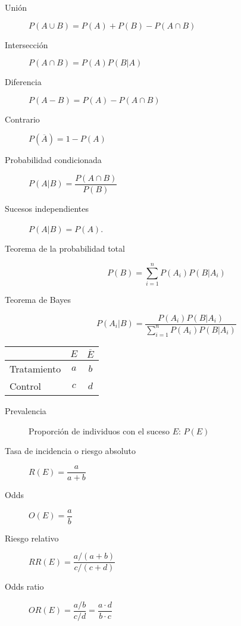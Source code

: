 \begin{multicols*}{2}
\begin{tcolorbox}[hbox, title=Probabilidad básica]
\begin{minipage}{0.4\textwidth}
\begin{description}
\item [Unión] $P(A\cup B)=P(A)+P(B)-P(A\cap B)$
\item [Intersección] $P(A\cap B)=P(A)P(B|A)$
\item [Diferencia] $P(A-B)=P(A)-P(A\cap B)$
\item [Contrario] $P(\overline{A})=1-P(A)$
\end{description}
\end{minipage}
\end{tcolorbox}

\begin{tcolorbox}[hbox, title=Probabilidad condicionada]
\begin{minipage}{0.4\textwidth}
\begin{description}
\item [Probabilidad condicionada] $P(A|B)=\dfrac{P(A\cap B)}{P(B)}$
\item [Sucesos independientes] $P(A|B)=P(A)$.
\item [Teorema de la probabilidad total] \[P(B)=\sum_{i=1}^n P(A_i)P(B|A_i)\]
\item [Teorema de Bayes] \[P(A_i|B)=\dfrac{P(A_i)P(B|A_i)}{\sum_{i=1}^n P(A_i)P(B|A_i)}\]
\end{description}
\end{minipage}
\end{tcolorbox}

\begin{tcolorbox}[hbox, title=Riesgos]
\begin{minipage}{0.4\textwidth}
\begin{center}
\begin{tabular}{|l|c|c|}
\cline{2-3}
\multicolumn{1}{c|}{} & $E$ & $\overline E$ \\
\hline
Tratamiento           & $a$ & $b$           \\
\hline
Control               & $c$ & $d$           \\
\hline
\end{tabular}
\end{center}
\begin{description}
\item[Prevalencia] Proporción de individuos con el suceso $E$: $P(E)$
\item[Tasa de incidencia o riesgo absoluto] $R(E)=\dfrac{a}{a+b}$
\item[Odds] $O(E)=\dfrac{a}{b}$
\item[Riesgo relativo] $RR(E)=\dfrac{a/(a+b)}{c/(c+d)}$
\item[Odds ratio] $OR(E)=\dfrac{a/b}{c/d}=\dfrac{a\cdot d}{b\cdot c}$
\end{description}
\end{minipage}
\end{tcolorbox}



\end{multicols*}
